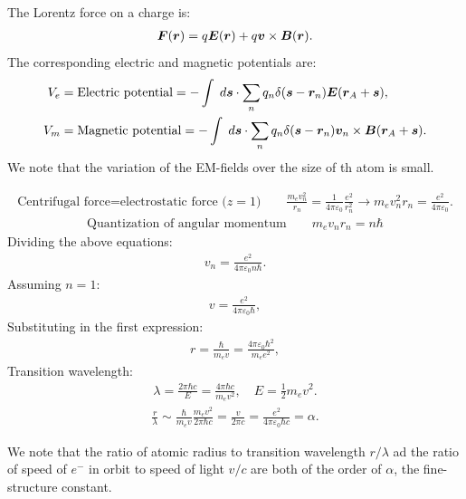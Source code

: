 The Lorentz force on a charge is:
\begin{align}
    \bm{F}(\bm{r})=q\bm{E}(\bm{r})+q\bm{v}\times\bm{B}(\bm{r}).
\end{align}
The corresponding electric and magnetic potentials are:
\begin{align}
    V_e&=\text{Electric potential}=-\int\;d\bm{s}\cdot\sum_nq_n\delta(\bm{s}-\bm{r}_n)\bm{E}(\bm{r}_A+\bm{s}),\\
    V_m&=\text{Magnetic potential}=-\int\;d\bm{s}\cdot\sum_nq_n\delta(\bm{s}-\bm{r}_n)\bm{v}_n\times\bm{B}(\bm{r}_A+\bm{s}).
\end{align}
We note that the variation of the EM-fields over the size of th atom is small. 

\begin{definition}
    \begin{align*}
        \text{Centrifugal force=electrostatic force ($z=1$)}\qquad\frac{m_ev_n^2}{r_n}=\frac{1}{4\pi\varepsilon_0}\frac{e^2}{r_n^2}\longrightarrow m_ev_n^2r_n=\frac{e^2}{4\pi\varepsilon_0}.
    \end{align*}
    \begin{align*}
        \text{Quantization of angular momentum}\qquad m_ev_nr_n=n\hbar
    \end{align*}
    Dividing the above equations:
    \begin{align*}
        v_n=\frac{e^2}{4\pi\varepsilon_0n\hbar}.
    \end{align*}
    Assuming $n=1$:
    \begin{align*}
        v=\frac{e^2}{4\pi\varepsilon_0\hbar},
    \end{align*}
    Substituting in the first expression:
    \begin{align*}
        r=\frac{\hbar}{m_ev}=\frac{4\pi\varepsilon_0\hbar^2}{m_ee^2},
    \end{align*}
    Transition wavelength:
    \begin{align*}
        \lambda=\frac{2\pi\hbar c}{E}=\frac{4\pi\hbar c}{m_ev^2},\quad E=\frac{1}{2}m_ev^2.
    \end{align*}
    \begin{align*}
        \frac{r}{\lambda}\sim\frac{\hbar}{m_ev}\frac{m_ev^2}{2\pi\hbar c}=\frac{v}{2\pi c}=\frac{e^2}{4\pi\varepsilon_0\hbar c}=\alpha.
    \end{align*}
\end{definition}





We note that the ratio of atomic radius to transition wavelength $r/\lambda$ ad the ratio of speed of $e^-$ in 
orbit to speed of light $v/c$ are both of the order of $\alpha$, the fine-structure constant.

